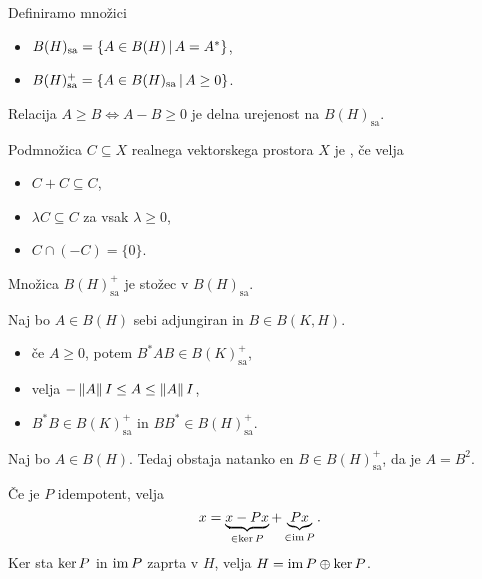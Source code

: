 Definiramo množici
\begin{itemize}
\item $B(H)_{\text{sa}} = \{ A \in B(H) \,|\, A = A^* \}$,
\item $B(H)_{\text{sa}}^+ = \{ A \in B(H)_{\text{sa}} \,|\, A \ge 0 \}$.
\end{itemize}

\begin{trditev}
  Relacija $A \ge B \iff A-B \ge 0$ je delna urejenost na $B(H)_{\text{sa}}$.
\end{trditev}

\begin{definicija}
  Podmnožica $C \subseteq X$ realnega vektorskega prostora $X$ je
  , če velja
  \begin{itemize}
  \item $C + C \subseteq C$,
  \item $\lambda C \subseteq C$ za vsak $\lambda \ge 0$,
  \item $C \cap (-C) = \{0\}$.
  \end{itemize}
\end{definicija}


\begin{trditev}
  Množica $B(H)_{\text{sa}}^+$ je stožec v $B(H)_{\text{sa}}$.
\end{trditev}

\begin{trditev}
  Naj bo $A \in B(H)$ sebi adjungiran in $B \in B(K,H)$.
  \begin{itemize}
  \item če $A \ge 0$, potem $B^* A B \in B(K)_{\text{sa}}^+$,
  \item velja $-\left\lVert A\right\rVert I \le A \le \left\lVert A\right\rVert I$,
  \item $B^* B \in B(K)_{\text{sa}}^+$ in $BB^* \in B(H)_{\text{sa}}^+$.
  \end{itemize}
\end{trditev}

\begin{izrek}
  Naj bo $A \in B(H)$.
  Tedaj obstaja natanko en $B \in B(H)_{\text{sa}}^+$, da je $A = B^2$.
\end{izrek}


Če je $P$ idempotent, velja
\[
  x = \underbrace{x - Px}_{\in \operatorname{ker} P} + \underbrace{Px}_{\in \operatorname{im} P}.
\]
Ker sta $\operatorname{ker} P$ in $\operatorname{im} P$ zaprta v $H$, velja $H = \operatorname{im} P \oplus \operatorname{ker} P$.

